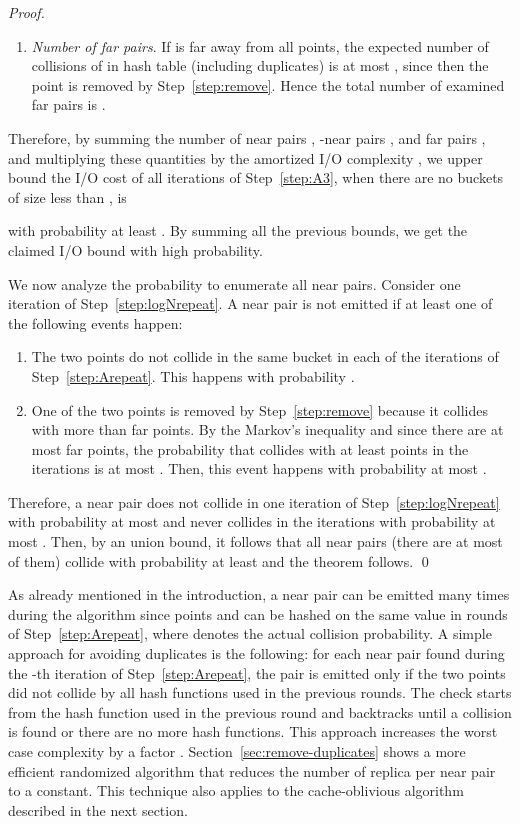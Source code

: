 \documentclass{llncs}
\begin{document}
\begin{proof}
\begin{enumerate}
\item \emph{Number of far pairs}. If  is far away from all
points, the expected number of collisions of  in  hash table (including
duplicates) is at most , since then the point is removed by
Step~\ref{step:remove}.
Hence the total number of examined far pairs is .


\end{enumerate}
Therefore, by summing the number of near pairs , -near pairs , and far pairs , and multiplying these quantities by the amortized I/O complexity , we upper bound the I/O cost of all iterations of Step~\ref{step:A3}, when there are no buckets of size less than , is

with probability at least .
By summing all the previous bounds, we get the claimed I/O bound with high probability.



We now  analyze the probability to enumerate all near pairs.
Consider one iteration of Step~\ref{step:logNrepeat}. A near pair is not emitted
if at least one of the following events happen:
\begin{enumerate}
 \item The two points do not collide in the same bucket in each of the 
iterations of Step~\ref{step:Arepeat}. This happens with probability
.
 \item One of the two points is removed by Step~\ref{step:remove} because it
collides with more than  far points.
By the Markov's inequality and since there are at most  far points, the
probability that  collides with at least  points in the  iterations
is at most . Then, this event happens with probability at most .
\end{enumerate}
Therefore, a near pair does not collide in one  iteration of
Step~\ref{step:logNrepeat} with probability at most  and never
collides in the  iterations with probability at most .
Then, by an union bound, it follows that all near pairs (there are at most 
of them) collide with probability at least  and the theorem
follows.
\qed
\end{proof}

As already mentioned in the introduction, a near pair  can be emitted many times during the algorithm since points  and  can be hashed on the same value in  rounds of Step~\ref{step:Arepeat}, where  denotes the actual collision probability.
A simple approach for avoiding duplicates is the following: for each near pair found during the -th iteration of Step~\ref{step:Arepeat}, the pair is emitted only if the two points did not collide by all hash functions used in the previous  rounds.
The check starts from the hash function used in the previous round and backtracks until a collision is found or there are no more hash functions. This approach increases the worst case complexity by a factor .
Section~\ref{sec:remove-duplicates} shows a more efficient randomized algorithm that reduces the number of replica per near pair to a constant. 
This technique also applies to the cache-oblivious algorithm described in the next section.
\end{document}
